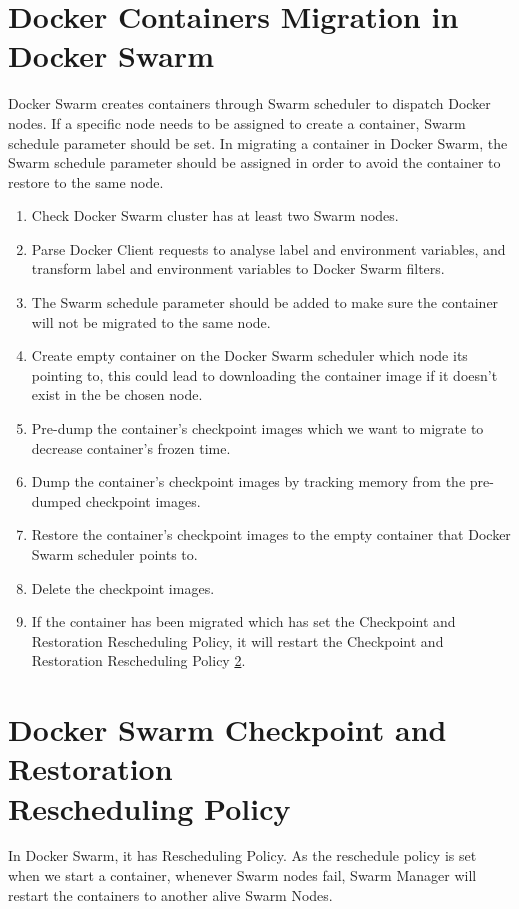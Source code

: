 \section{Docker Containers Migration in Docker Swarm}
Docker Swarm creates containers through Swarm scheduler to dispatch Docker nodes. If a specific node needs to be assigned to create a container, Swarm schedule parameter should be set.
In migrating a container in Docker Swarm, the Swarm schedule parameter should be assigned in order to avoid the container to restore to the same node.
\begin{enumerate}[Step 1.]
	\item Check Docker Swarm cluster has at least two Swarm nodes.
    \item Parse Docker Client requests to analyse label and environment variables, and transform label and environment variables to Docker Swarm filters.
    \item The Swarm schedule parameter should be added to make sure the container will not be migrated to the same node.
    \item Create empty container on the Docker Swarm scheduler which node its pointing to, this could lead to downloading the container image if it doesn't exist in the be chosen node.
    \item Pre-dump the container's checkpoint images which we want to migrate to decrease container's frozen time.
    \item Dump the container's checkpoint images by tracking memory from the pre-dumped checkpoint images.
    \item Restore the container's checkpoint images to the empty container that Docker Swarm scheduler points to.
    \item Delete the checkpoint images.
    \item If the container has been migrated which has set the Checkpoint and Restoration Rescheduling Policy, it will restart the Checkpoint and Restoration Rescheduling Policy \ref{sec:checkpoint restore rescheduling policy}.
\end{enumerate}

\section{Docker Swarm Checkpoint and Restoration \\Rescheduling Policy}
\label{sec:checkpoint restore rescheduling policy}
In Docker Swarm, it has Rescheduling Policy. As the reschedule policy is set when we start a container, whenever Swarm nodes fail, Swarm Manager will restart the containers to another alive Swarm Nodes.

